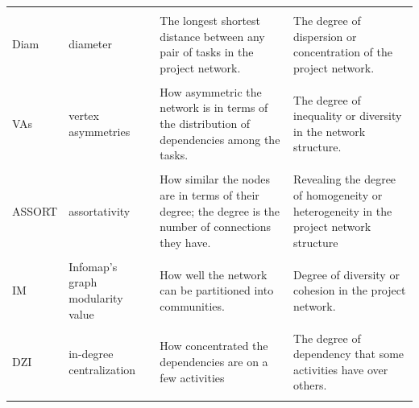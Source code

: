 \documentclass[preprint,
3p]{elsarticle} %
\begin{document}
\begin{appendices}
\begin{longtable}[t]{l>{\raggedright\arraybackslash}p{2.2cm}>{\raggedright\arraybackslash}p{3.8cm}>{\raggedright\arraybackslash}p{4.2cm}}
\endfoot
\bottomrule
\endlastfoot
\cellcolor{gray!10}{Dens} & \cellcolor{gray!10}{density} & \cellcolor{gray!10}{How many dependencies exist in the project network} & \cellcolor{gray!10}{Degree of complexity of the project network}\\
Diam & diameter & The longest shortest distance between any pair of tasks in the project network. & The degree of dispersion or concentration of the project network.\\
\cellcolor{gray!10}{AVPL} & \cellcolor{gray!10}{average path length} & \cellcolor{gray!10}{Average shortest distance between any pair of tasks in the project network} & \cellcolor{gray!10}{The degree of dispersion or concentration of the project network.}\\
VAs & vertex asymmetries & How asymmetric the network is in terms of the distribution of dependencies among the tasks. & The degree of inequality or diversity in the network structure.\\
\cellcolor{gray!10}{Mot} & \cellcolor{gray!10}{number of motifs} & \cellcolor{gray!10}{The number of recurring patterns of dependencies in the project network.} & \cellcolor{gray!10}{The degree of regularity or randomness of the network.}\\
\addlinespace
ASSORT & assortativity & How similar the nodes are in terms of their degree; the degree is the number of connections they have. & Revealing the degree of homogeneity or heterogeneity in the project network structure\\
\cellcolor{gray!10}{LeM} & \cellcolor{gray!10}{Leiden's graph modularity value} & \cellcolor{gray!10}{How well the network can be partitioned into communities.} & \cellcolor{gray!10}{Degree of diversity or cohesion in the project network.}\\
IM & Infomap's graph modularity value & How well the network can be partitioned into communities. & Degree of diversity or cohesion in the project network.\\
\cellcolor{gray!10}{SGM} & \cellcolor{gray!10}{Spin-Glass graph modularity value} & \cellcolor{gray!10}{How well the network can be partitioned into communities.} & \cellcolor{gray!10}{Degree of diversity or cohesion in the project network.}\\
DZI & in-degree centralization & How concentrated the dependencies are on a few activities & The degree of dependency that some activities have over others.\\
\addlinespace
\cellcolor{gray!10}{DZO} & \cellcolor{gray!10}{out-degree centralization} & \cellcolor{gray!10}{How concentrated the dependencies are on a few activities} & \cellcolor{gray!10}{Degree of influence that some activities have over others.}\\

\end{longtable}
\end{appendices}
\end{document}
